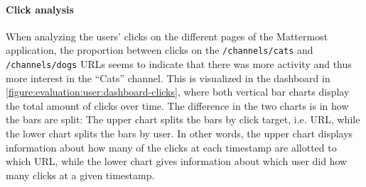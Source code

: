 \FloatBarrier

\paragraph{Click analysis}

When analyzing the users' clicks on the different pages of the Mattermost application, the proportion between clicks on the \texttt{/channels/cats} and \texttt{/channels/dogs} URLs seems to indicate that there was more activity and thus more interest in the ``Cats'' channel.
This is visualized in the dashboard in \cref{figure:evaluation:user:dashboard-clicks}, where both vertical bar charts display the total amount of clicks over time.
The difference in the two charts is in how the bars are split:
The upper chart splits the bars by click target, i.e. URL, while the lower chart splits the bars by user.
In other words, the upper chart displays information about how many of the clicks at each timestamp are allotted to which URL, while the lower chart gives information about which user did how many clicks at a given timestamp.

